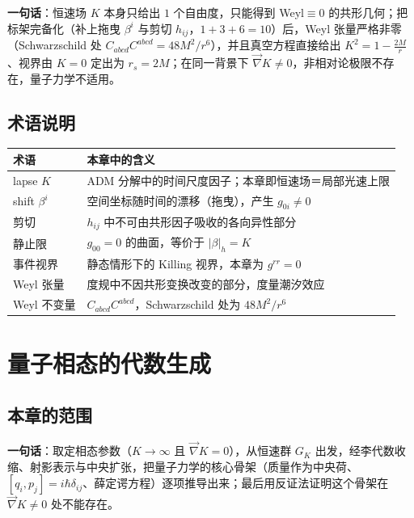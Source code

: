 \documentclass[
  chinese,
  a4paper,
  UTF8,
  12pt,
  oneside,
  openany]{ctexbook}
\newcounter{none} %
\theoremstyle{plain}
\theoremstyle{plain}
\theoremstyle{plain}
\theoremstyle{definition}
\theoremstyle{plain}
\theoremstyle{plain}
\theoremstyle{remark}
\begin{document}
\textbf{一句话}：恒速场 \(K\) 本身只给出 \(1\) 个自由度，只能得到
Weyl\(\equiv0\) 的共形几何；把标架完备化（补上拖曳 \(\beta^{i}\) 与剪切
\(h_{ij}\)，\(1+3+6=10\)）后，Weyl 张量严格非零（Schwarzschild 处
\(C_{abcd}C^{abcd}=48M^{2}/r^{6}\)），并且真空方程直接给出
\(K^{2}=1-\frac{2M}{r}\)、视界由 \(K=0\) 定出为 \(r_s=2M\)；在同一背景下
\(\vec\nabla K\neq0\)，非相对论极限不存在，量子力学不适用。

\section{术语说明}\label{sec-isg2-terms}

{\def\LTcaptype{none} %
\begin{longtable}[]{@{}ll@{}}
\toprule\noalign{}
术语 & 本章中的含义 \\
\midrule\noalign{}
\endhead
\bottomrule\noalign{}
\endlastfoot
lapse \(K\) & ADM 分解中的时间尺度因子；本章即恒速场＝局部光速上限 \\
shift \(\beta^{i}\) & 空间坐标随时间的漂移（拖曳），产生
\(g_{0i}\neq0\) \\
剪切 & \(h_{ij}\) 中不可由共形因子吸收的各向异性部分 \\
静止限 & \(g_{00}=0\) 的曲面，等价于 \(\lvert\beta\rvert_h=K\) \\
事件视界 & 静态情形下的 Killing 视界，本章为 \(g^{rr}=0\) \\
Weyl 张量 & 度规中不因共形变换改变的部分，度量潮汐效应 \\
Weyl 不变量 & \(C_{abcd}C^{abcd}\)，Schwarzschild 处为
\(48M^{2}/r^{6}\) \\
\end{longtable}
}


\chapter{量子相态的代数生成}\label{sec-quantum-phase}

\section{本章的范围}\label{sec-qp-scope}

\textbf{一句话}：取定相态参数（\(K\to\infty\) 且
\(\vec\nabla K=0\)），从恒速群 \(G_K\)
出发，经李代数收缩、射影表示与中央扩张，把量子力学的核心骨架（质量作为中央荷、\([q_i,p_j]=i\hbar\delta_{ij}\)、薛定谔方程）逐项推导出来；最后用反证法证明这个骨架在
\(\vec\nabla K\neq0\) 处不能存在。
\end{document}
